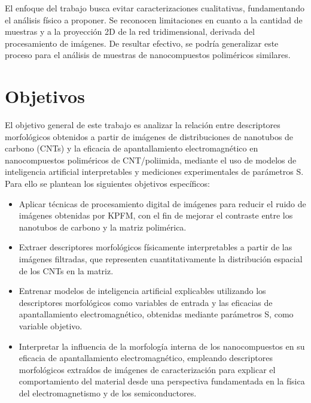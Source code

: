 El enfoque del trabajo busca evitar caracterizaciones cualitativas, fundamentando el análisis físico a proponer. Se reconocen limitaciones en cuanto a la cantidad de muestras y a la proyección 2D de la red tridimensional, derivada del procesamiento de imágenes. De resultar efectivo, se podría generalizar este proceso para el análisis de muestras de nanocompuestos poliméricos similares.

\section{Objetivos}
\label{sec:objetivos}
El objetivo general de este trabajo es analizar la relación entre descriptores morfológicos obtenidos a partir de imágenes de distribuciones de nanotubos de carbono (CNTs) y la eficacia de apantallamiento electromagnético en nanocompuestos poliméricos de CNT/poliimida, mediante el uso de modelos de inteligencia artificial interpretables y mediciones experimentales de parámetros S. Para ello se plantean los siguientes objetivos específicos:
\begin{itemize}

\item Aplicar técnicas de procesamiento digital de imágenes para reducir el ruido de imágenes obtenidas por KPFM, con el fin de mejorar el contraste entre los nanotubos de carbono y la matriz polimérica.
\item Extraer descriptores morfológicos físicamente interpretables a partir de las imágenes filtradas, que representen cuantitativamente la distribución espacial de los CNTs en la matriz.
\item Entrenar modelos de inteligencia artificial explicables utilizando los descriptores morfológicos como variables de entrada y las eficacias de apantallamiento electromagnético, obtenidas mediante parámetros S, como variable objetivo.
\item Interpretar la influencia de la morfología interna de los nanocompuestos en su eficacia de apantallamiento electromagnético, empleando descriptores morfológicos extraídos de imágenes de caracterización para explicar el comportamiento del material desde una perspectiva fundamentada en la física del electromagnetismo y de los semiconductores.
\end{itemize}
